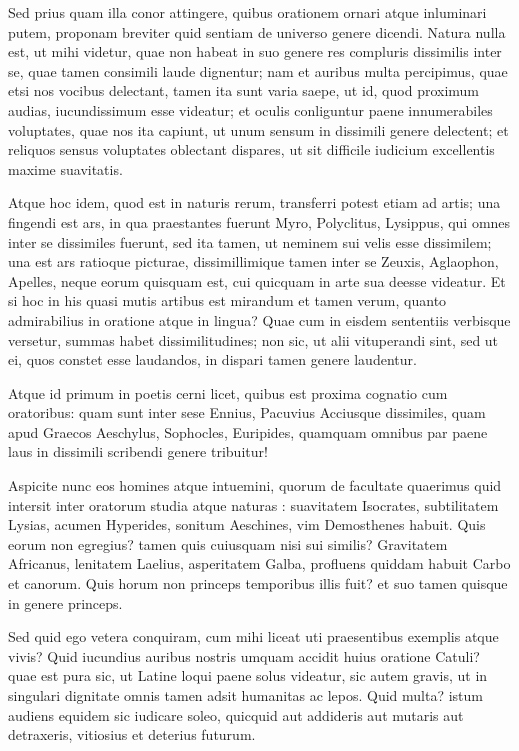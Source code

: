  Sed prius quam illa conor attingere, quibus orationem ornari atque inluminari putem, proponam breviter quid sentiam de universo genere dicendi. Natura nulla est, ut mihi videtur, quae non habeat in suo genere res compluris dissimilis inter se, quae tamen consimili laude dignentur; nam et auribus multa percipimus, quae etsi nos vocibus delectant, tamen ita sunt varia saepe, ut id, quod proximum audias, iucundissimum esse videatur; et oculis conliguntur paene innumerabiles voluptates, quae nos ita capiunt, ut unum sensum in dissimili genere delectent; et reliquos sensus voluptates oblectant dispares, ut sit difficile iudicium excellentis maxime suavitatis.

 Atque hoc idem, quod est in naturis rerum, transferri potest etiam ad artis; una fingendi est ars, in qua praestantes fuerunt Myro, Polyclitus, Lysippus, qui omnes inter se dissimiles fuerunt, sed ita tamen, ut neminem sui velis esse dissimilem; una est ars ratioque picturae, dissimillimique tamen inter se Zeuxis, Aglaophon, Apelles, neque eorum quisquam est, cui quicquam in arte sua deesse videatur. Et si hoc in his quasi mutis artibus est mirandum et tamen verum, quanto admirabilius in oratione atque in lingua? Quae cum in eisdem sententiis verbisque versetur, summas habet dissimilitudines; non sic, ut alii vituperandi sint, sed ut ei, quos constet esse laudandos, in dispari tamen genere laudentur.

 Atque id primum in poetis cerni licet, quibus est proxima cognatio cum oratoribus: quam sunt inter sese Ennius, Pacuvius Acciusque dissimiles, quam apud Graecos Aeschylus, Sophocles, Euripides, quamquam omnibus par paene laus in dissimili scribendi genere tribuitur!

 Aspicite nunc eos homines atque intuemini, quorum de facultate quaerimus quid intersit inter oratorum studia atque naturas : suavitatem Isocrates, subtilitatem Lysias, acumen Hyperides, sonitum Aeschines, vim Demosthenes habuit. Quis eorum non egregius? tamen quis cuiusquam nisi sui similis? Gravitatem Africanus, lenitatem Laelius, asperitatem Galba, profluens quiddam habuit Carbo et canorum. Quis horum non princeps temporibus illis fuit? et suo tamen quisque in genere princeps.

 Sed quid ego vetera conquiram, cum mihi liceat uti praesentibus exemplis atque vivis? Quid iucundius auribus nostris umquam accidit huius oratione Catuli? quae est pura sic, ut Latine loqui paene solus videatur, sic autem gravis, ut in singulari dignitate omnis tamen adsit humanitas ac lepos. Quid multa? istum audiens equidem sic iudicare soleo, quicquid aut addideris aut mutaris aut detraxeris, vitiosius et deterius futurum.

